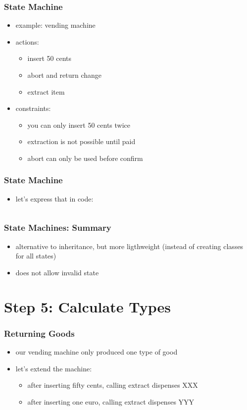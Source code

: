 \documentclass{beamer}
\begin{document}
\begin{frame}
  \frametitle{State Machine}
  \begin{itemize}
  \item example: vending machine
  \item actions:
    \begin{itemize}
    \item insert 50 cents
    \item abort and return change
    \item extract item
    \end{itemize}
  \item constraints:
    \begin{itemize}
    \item you can only insert 50 cents twice
    \item extraction is not possible until paid
    \item abort can only be used before confirm
    \end{itemize}
  \end{itemize}
\end{frame}

\begin{frame}[fragile]
  \frametitle{State Machine}
  \begin{itemize}
  \item let's express that in code:
  \end{itemize}

\begin{verbatim}

\end{verbatim}
\end{frame}

\begin{frame}
  \frametitle{State Machines: Summary}
  \begin{itemize}
  \item alternative to inheritance, but more ligthweight (instead of
    creating classes for all states)
  \item does not allow invalid state
  \end{itemize}
\end{frame}

\section{Step 5: Calculate Types}

\begin{frame}
  \frametitle{Returning Goods}
  \begin{itemize}
  \item our vending machine only produced one type of good
  \item let's extend the machine:
    \begin{itemize}
    \item after inserting fifty cents, calling extract dispenses XXX
    \item after inserting one euro, calling extract dispenses YYY
    \end{itemize}
  \end{itemize}
\end{frame}
\end{document}
